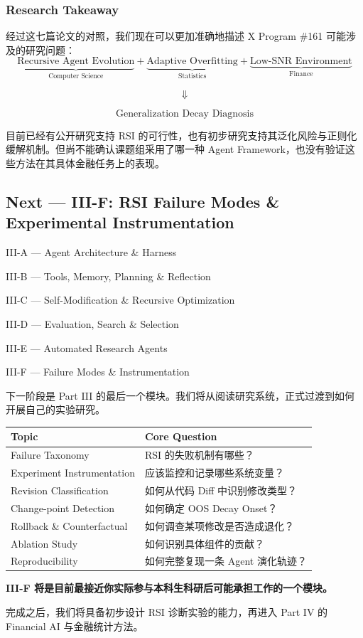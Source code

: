 \hypertarget{part-3-44-0001-research-takeaway}{%
\subsubsection{Research Takeaway}\label{part-3-44-0001-research-takeaway}}

经过这七篇论文的对照，我们现在可以更加准确地描述 X Program \#161 可能涉及的研究问题：
\[\underbrace{\text{Recursive Agent Evolution}}_{\text{Computer Science}}
+
\underbrace{\text{Adaptive Overfitting}}_{\text{Statistics}}
+
\underbrace{\text{Low-SNR Environment}}_{\text{Finance}}\]

\[\Downarrow\]

\[\boxed{
\text{Generalization Decay Diagnosis}
}\]

目前已经有公开研究支持 RSI 的可行性，也有初步研究支持其泛化风险与正则化缓解机制。但尚不能确认课题组采用了哪一种 Agent Framework，也没有验证这些方法在其具体金融任务上的表现。

\hypertarget{part-3-44-0001-next-iii-f-rsi-failure-modes-experimental-instrumentation}{%
\subsection{Next --- III-F: RSI Failure Modes \& Experimental Instrumentation}\label{part-3-44-0001-next-iii-f-rsi-failure-modes-experimental-instrumentation}}

III-A --- Agent Architecture \& Harness

III-B --- Tools, Memory, Planning \& Reflection

III-C --- Self-Modification \& Recursive Optimization

III-D --- Evaluation, Search \& Selection

III-E --- Automated Research Agents

III-F --- Failure Modes \& Instrumentation

下一阶段是 Part III 的最后一个模块。我们将从阅读研究系统，正式过渡到如何开展自己的实验研究。

\begin{readertable}
\begin{longtable}[]{@{}
  >{\raggedright\arraybackslash}p{}
  >{\raggedright\arraybackslash}p{}@{}}
\toprule
Topic & Core Question \\
\midrule
\endhead
Failure Taxonomy & RSI 的失败机制有哪些？ \\
Experiment Instrumentation & 应该监控和记录哪些系统变量？ \\
Revision Classification & 如何从代码 Diff 中识别修改类型？ \\
Change-point Detection & 如何确定 OOS Decay Onset？ \\
Rollback \& Counterfactual & 如何调查某项修改是否造成退化？ \\
Ablation Study & 如何识别具体组件的贡献？ \\
Reproducibility & 如何完整复现一条 Agent 演化轨迹？ \\
\bottomrule
\end{longtable}
\end{readertable}

\textbf{III-F 将是目前最接近你实际参与本科生科研后可能承担工作的一个模块。}

完成之后，我们将具备初步设计 RSI 诊断实验的能力，再进入 Part IV 的 Financial AI 与金融统计方法。
